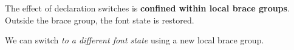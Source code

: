The effect of declaration switches is {\bfseries confined within local brace groups}. Outside the brace group, the font state is restored.

We can switch {\itshape to a different font state} using a new local brace group.